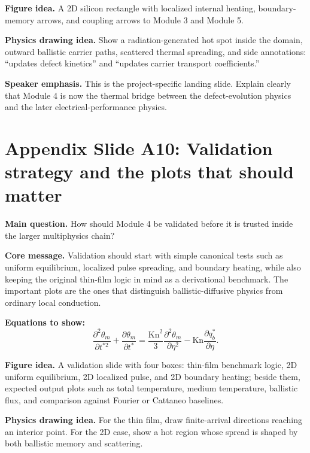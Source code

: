 \documentclass[11pt]{article}
\begin{document}
\textbf{Figure idea.} A 2D silicon rectangle with localized internal heating, boundary-memory arrows, and coupling arrows to Module 3 and Module 5.

\textbf{Physics drawing idea.} Show a radiation-generated hot spot inside the domain, outward ballistic carrier paths, scattered thermal spreading, and side annotations: ``updates defect kinetics'' and ``updates carrier transport coefficients.''

\textbf{Speaker emphasis.} This is the project-specific landing slide. Explain clearly that Module 4 is now the thermal bridge between the defect-evolution physics and the later electrical-performance physics.

\section{Appendix Slide A10: Validation strategy and the plots that should matter}
\begin{physicsbox}
\textbf{Main question.} How should Module 4 be validated before it is trusted inside the larger multiphysics chain?
\end{physicsbox}

\textbf{Core message.} Validation should start with simple canonical tests such as uniform equilibrium, localized pulse spreading, and boundary heating, while also keeping the original thin-film logic in mind as a derivational benchmark. The important plots are the ones that distinguish ballistic-diffusive physics from ordinary local conduction.

\textbf{Equations to show:}
\begin{equation*}
\frac{\partial^2 \theta_m}{\partial t^{*2}}+\frac{\partial \theta_m}{\partial t^*}
=\frac{\mathrm{Kn}^2}{3}\frac{\partial^2 \theta_m}{\partial \eta^2}
-\mathrm{Kn}\frac{\partial q_b^*}{\partial \eta}.
\end{equation*}

\textbf{Figure idea.} A validation slide with four boxes: thin-film benchmark logic, 2D uniform equilibrium, 2D localized pulse, and 2D boundary heating; beside them, expected output plots such as total temperature, medium temperature, ballistic flux, and comparison against Fourier or Cattaneo baselines.

\textbf{Physics drawing idea.} For the thin film, draw finite-arrival directions reaching an interior point. For the 2D case, show a hot region whose spread is shaped by both ballistic memory and scattering.
\end{document}
